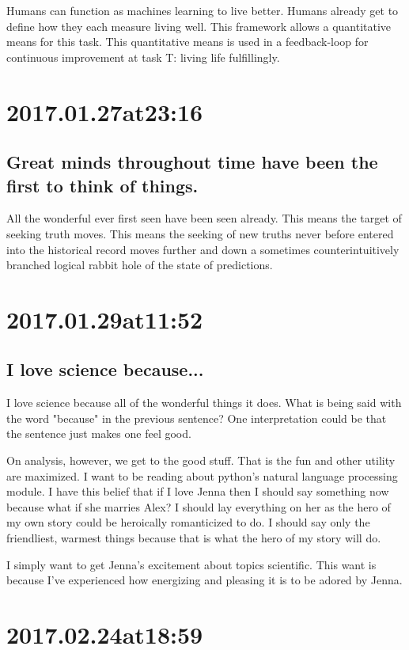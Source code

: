 Humans can function as machines learning to live better. Humans already get to define how they each measure living well. This framework allows a quantitative means for this task. This quantitative means is used in a feedback-loop for continuous improvement at task T: living life fulfillingly.

\section*{ 2017.01.27at23:16 }
\subsection*{ Great minds throughout time have been the first to think of things. }
All the wonderful ever first seen have been seen already. This means the target of seeking truth moves. This means the seeking of new truths never before entered into the historical record moves further and down a sometimes counterintuitively branched logical rabbit hole of the state of predictions.

\section*{ 2017.01.29at11:52 }
\subsection*{ I love science because... }
I love science because all of the wonderful things it does. What is being said with the word "because" in the previous sentence? One interpretation could be that the sentence just makes one feel good.

On analysis, however, we get to the good stuff. That is the fun and other utility are maximized. I want to be reading about python's natural language processing module. I have this belief that if I love Jenna then I should say something now because what if she marries Alex? I should lay everything on her as the hero of my own story could be heroically romanticized to do. I should say only the friendliest, warmest things because that is what the hero of my story will do.

I simply want to get Jenna's excitement about topics scientific. This want is because I've experienced how energizing and pleasing it is to be adored by Jenna. 

\section*{ 2017.02.24at18:59 }
